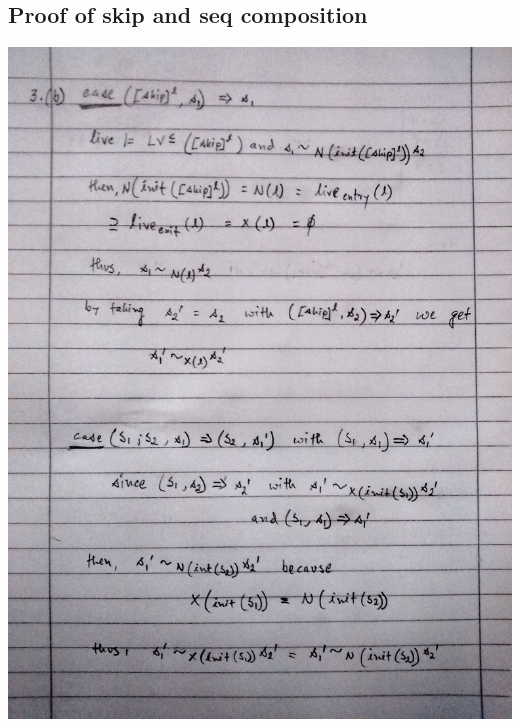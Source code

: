 \documentclass[a4paper, 12pt]{article}
\begin{document}
\subsection{Proof of skip and seq composition}
\includegraphics[scale=0.25]{img/3b}



\end{document}
